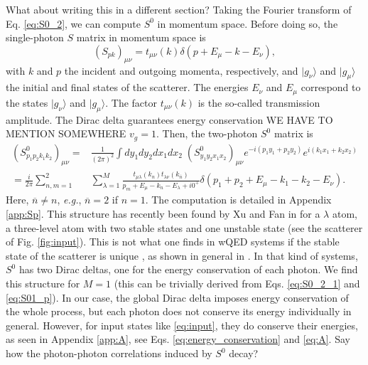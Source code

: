\documentclass[notitlepage, prx, preprint, amsmath,superscriptaddress,amssymb]{revtex4-1}
\begin{document}
{\color{blue}What about writing this in a different section?} Taking the Fourier transform of Eq. \eqref{eq:S0_2}, we can compute $S^0$ in momentum space. Before doing so, the single-photon $S$ matrix in momentum space is
\begin{equation}\label{eq:S01_p}
(S_{pk})_{\mu\nu}=t_{\mu\nu}(k)\delta(p+E_\mu-k-E_\nu),
\end{equation}
with $k$ and $p$ the incident and outgoing momenta, respectively, and $|g_\nu\rangle$ and $|g_\mu\rangle$ the initial and final states of the scatterer. The energies $E_\nu$ and $E_\mu$ correspond to the states $|g_\nu\rangle$ and $|g_\mu\rangle$. The factor $t_{\mu\nu}(k)$ is the so-called transmission amplitude. The Dirac delta guarantees energy conservation {\color{blue}WE HAVE TO MENTION SOMEWHERE $v_g=1$}. Then, the two-photon $S^0$ matrix is
\begin{align}\label{eq:S0_2p}
(S_{p_1p_2k_1k_2}^0)_{\mu\nu}=&\frac{1}{(2\pi)^2}\int  dy_1dy_2dx_1dx_2\; (S_{y_1y_2x_1x_2}^0)_{\mu\nu} e^{-i(p_1y_1+p_2y_2)}  e^{i(k_1x_1+k_2x_2)} \nonumber\\
=  \frac{i}{2\pi}\sum_{n,m=1}^2 &\sum_{\lambda=1}^M  \frac{t_{\mu\lambda}(k_n) t_{\lambda\nu}(k_{\overline{n}})}{p_m+E_\mu -k_n -E_\lambda + i0^+}\delta(p_1+p_2+E_\mu - k_1-k_2-E_\nu).
\end{align}
Here, $\overline{n}\neq n$, \emph{e.g.}, $\overline{n}=2$ if $n=1$. The computation is detailed in Appendix \ref{app:Sp}. This structure has recently been found by Xu and Fan in \cite{Xu2016} for a $\lambda$ atom, a three-level atom with two stable states and one unstable state (see the scatterer of Fig. \ref{fig:input}). This is not what one finds in wQED systems if the stable state of the scatterer is unique \cite{Fan2010,Rephaeli2011,Sanchez-Burillo2016b}, as shown in general in \cite{Xu2013}. In that kind of systems, $S^0$ has two Dirac deltas, one for the energy conservation of each photon. We find this structure for $M=1$ (this can be trivially derived from Eqs. \eqref{eq:S0_2_1} and \eqref{eq:S01_p}). In our case, the global Dirac delta imposes energy conservation of the whole process, but each photon does not conserve its energy individually in general. However, for input states like \eqref{eq:input}, they do conserve their energies, as seen in Appendix \ref{app:A}, see Eqs. \eqref{eq:energy_conservation} and \eqref{eq:A}. {\color{blue}Say how the photon-photon correlations induced by $S^0$ decay?} %
\end{document}
